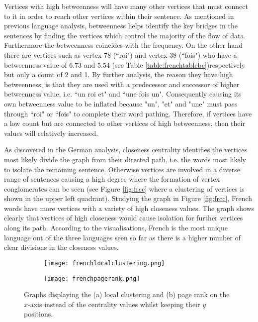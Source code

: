 Vertices with high betweenness will have many other vertices that must connect to it in order to reach other vertices within their sentence. As mentioned in previous language analysis, betweenness helps identify the key bridges in the sentences by finding the vertices which control the majority of the flow of data. Furthermore the betweenness coincides with the frequency. On the other hand there are vertices such as vertex 78 (``roi") and vertex 38 (``fois") who have a betweenness value of $6.73$ and $5.54$ (see Table \ref{table:frenchtablebc})respectively but only a count of 2 and 1. By further analysis, the reason they have high betweenness, is that they are used with a predecessor and successor of higher betweenness value, i.e. ``un roi et" and ``une fois un". Consequently causing its own betweenness value to be inflated because "un", "et" and "une" must pass through ``roi" or ``fois" to complete their word pathing. Therefore, if vertices have a low count but are connected to other vertices of high betweenness, then their values will relatively increased.

As discovered in the German analysis, closeness centrality identifies the vertices most likely divide the graph from their directed path, i.e. the words most likely to isolate the remaining sentence. Otherwise vertices are involved in a diverse range of sentences causing a high degree where the formation of vertex conglomerates can be seen (see Figure \ref{fig:frcc} where a clustering of vertices is shown in the upper left quadrant). Studying the graph in Figure \ref{fig:frcc}, French words have more vertices with a variety of high closeness values. The graph shows clearly that vertices of high closeness would cause isolation for further vertices along its path. According to the visualisations, French is the most unique language out of the three languages seen so far as there is a higher number of clear divisions in the closeness values.

\begin{figure}[!htb]
\centering
\begin{subfigure}{.45\textwidth}
	\hspace{-1cm} 
	\texttt{[image: frenchlocalclustering.png]}
	\caption{}
	\label{fig:frlc}
\end{subfigure}
\hfill
\begin{subfigure}{.45\textwidth}
	\hspace{-1cm} 
	\texttt{[image: frenchpagerank.png]}
	\caption{}
	\label{fig:frpr}
\end{subfigure}
\caption{Graphs displaying the (a) local clustering and (b) page rank on the $x$-axis instead of the centrality values whilst keeping their $y$ positions.}
\label{fig:frother}
\end{figure}

